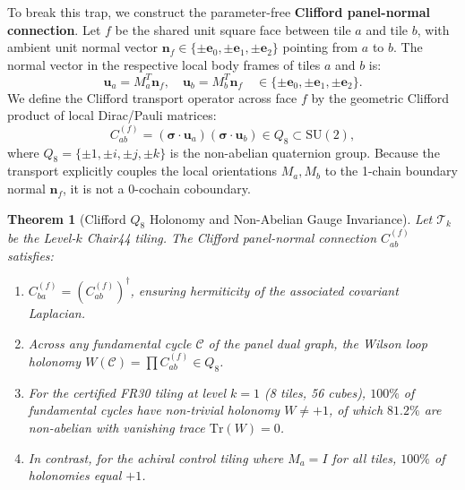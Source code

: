 \documentclass[11pt,a4paper]{article}
\newtheorem{theorem}{Theorem}[section]
\theoremstyle{definition}
\newcommand{\SU}{\mathrm{SU}}
\newcommand{\Tr}{\mathrm{Tr}}
\begin{document}
To break this trap, we construct the parameter-free \textbf{Clifford panel-normal connection}. Let $f$ be the shared unit square face between tile $a$ and tile $b$, with ambient unit normal vector $\mathbf{n}_f \in \{\pm \mathbf{e}_0, \pm \mathbf{e}_1, \pm \mathbf{e}_2\}$ pointing from $a$ to $b$. The normal vector in the respective local body frames of tiles $a$ and $b$ is:
\begin{equation}
\mathbf{u}_a = M_a^T \mathbf{n}_f, \quad \mathbf{u}_b = M_b^T \mathbf{n}_f \quad \in \{\pm \mathbf{e}_0, \pm \mathbf{e}_1, \pm \mathbf{e}_2\}.
\end{equation}
We define the Clifford transport operator across face $f$ by the geometric Clifford product of local Dirac/Pauli matrices:
\begin{equation}
C_{ab}^{(f)} = (\boldsymbol{\sigma} \cdot \mathbf{u}_a)(\boldsymbol{\sigma} \cdot \mathbf{u}_b) \in Q_8 \subset \SU(2),
\end{equation}
where $Q_8 = \{\pm 1, \pm i, \pm j, \pm k\}$ is the non-abelian quaternion group. Because the transport explicitly couples the local orientations $M_a, M_b$ to the 1-chain boundary normal $\mathbf{n}_f$, it is not a 0-cochain coboundary.

\begin{theorem}[Clifford $Q_8$ Holonomy and Non-Abelian Gauge Invariance]
\label{thm:clifford_holonomy}
Let $\mathcal{T}_k$ be the Level-$k$ Chair44 tiling. The Clifford panel-normal connection $C_{ab}^{(f)}$ satisfies:
\begin{enumerate}
    \item $C_{ba}^{(f)} = (C_{ab}^{(f)})^\dagger$, ensuring hermiticity of the associated covariant Laplacian.
    \item Across any fundamental cycle $\mathcal{C}$ of the panel dual graph, the Wilson loop holonomy $W(\mathcal{C}) = \prod C_{ab}^{(f)} \in Q_8$.
    \item For the certified FR30 tiling at level $k=1$ (8 tiles, 56 cubes), $100\%$ of fundamental cycles have non-trivial holonomy $W \neq +1$, of which $81.2\%$ are non-abelian with vanishing trace $\Tr(W) = 0$.
    \item In contrast, for the achiral control tiling where $M_a = I$ for all tiles, $100\%$ of holonomies equal $+1$.
\end{enumerate}
\end{theorem}
\end{document}
